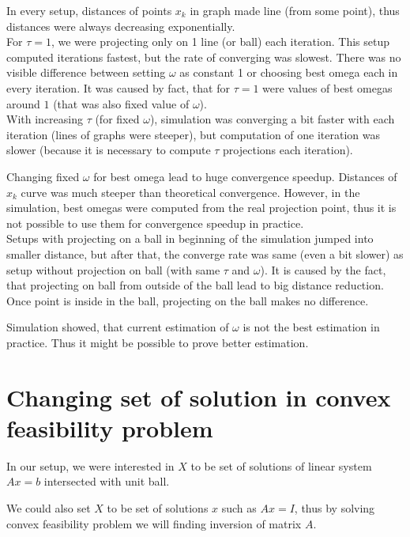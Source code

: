 \documentclass[11pt]{book}
\begin{document}
In every setup, distances of points $x_k$ in graph made line (from some point), thus distances were always decreasing exponentially.\\

For $\tau=1$, we were projecting only on 1 line (or ball) each iteration. This setup computed iterations fastest, but the rate of converging was slowest. There was no visible difference between setting $\omega$ as constant 1 or choosing best omega each in every iteration. It was caused by fact, that for $\tau=1$ were values of best omegas around $1$ (that was also fixed value of $\omega$).\\

With increasing $\tau$ (for fixed $\omega$), simulation was converging a bit faster with each iteration (lines of graphs were steeper), but computation of one iteration was slower (because it is necessary to compute $\tau$ projections each iteration).

Changing fixed $\omega$ for best omega lead to huge convergence speedup. Distances of $x_k$ curve was much steeper than theoretical convergence. However, in the simulation, best omegas were computed from the real projection point, thus it is not possible to use them for convergence speedup in practice.\\

Setups with projecting on a ball in beginning of the simulation jumped into smaller distance, but after that, the converge rate was same (even a bit slower) as setup without projection on ball (with same $\tau$ and $\omega$). It is caused by the fact, that projecting on ball from outside of the ball lead to big distance reduction. Once point is inside in the ball, projecting on the ball makes no difference.

Simulation showed, that current estimation of $\omega$ is not the best estimation in practice. Thus it might be possible to prove better estimation.

\section{Changing set of solution in convex feasibility problem}

In our setup, we were interested in $X$ to be set of solutions of linear system $Ax=b$ intersected with unit ball.

We could also set $X$ to be set of solutions $x$ such as $Ax=I$, thus by solving convex feasibility problem we will finding inversion of matrix $A$.
\end{document}
